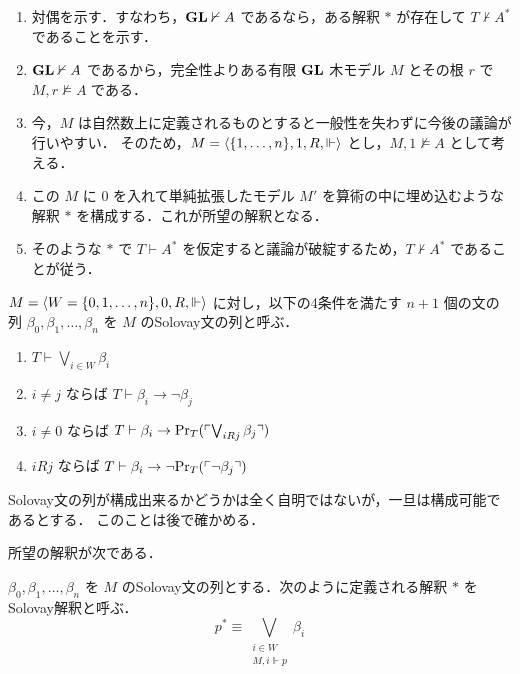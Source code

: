 \documentclass{jlreq}
\begin{document}
\begin{outline}
	\begin{enumerate}
		\item 対偶を示す．すなわち，$\mathbf{GL} \nvdash A$ であるなら，ある解釈 $*$ が存在して $T \nvdash A^*$ であることを示す．
		\item $\mathbf{GL} \nvdash A$ であるから，完全性よりある有限 $\mathbf{GL}$ 木モデル $M$ とその根 $r$ で $M,r \nvDash A$ である．
		\item 今，$M$ は自然数上に定義されるものとすると一般性を失わずに今後の議論が行いやすい．
		      そのため，$M = \langle \{1,\dots,n\}, 1, R, \Vdash \rangle$ とし，$M,1 \nvDash A$ として考える．
		\item この $M$ に $0$ を入れて単純拡張したモデル $M'$ を算術の中に埋め込むような解釈 $*$ を構成する．これが所望の解釈となる．
		\item そのような $*$ で $T \vdash A^*$ を仮定すると議論が破綻するため，$T \nvdash A^*$ であることが従う．
	\end{enumerate}
\end{outline}

\begin{definition}
	$M = \langle W = \{0,1,\dots,n\}, 0, R, \Vdash \rangle$ に対し，以下の4条件を満たす $n + 1$ 個の文の列 $\beta_0, \beta_1, \dots, \beta_n$ を $M$ のSolovay文の列と呼ぶ．
	\begin{enumerate}
		\item $T \vdash \bigvee_{i \in W} \beta_i$
		\item $i \neq j$ ならば $T \vdash \beta_i \to \lnot \beta_j$
		\item $i \neq 0$ ならば $T \vdash \beta_i \to \mathrm{Pr}_T(\ulcorner \bigvee_{i R j} \beta_j \urcorner)$
		\item $i R j$ ならば $T \vdash \beta_i \to \lnot \mathrm{Pr}_T(\ulcorner \lnot \beta_j \urcorner)$
	\end{enumerate}
\end{definition}

\begin{remark}
	Solovay文の列が構成出来るかどうかは全く自明ではないが，一旦は構成可能であるとする．
	このことは後で確かめる．
\end{remark}

所望の解釈が次である．

\begin{definition}
	$\beta_0, \beta_1, \dots, \beta_n$ を $M$ のSolovay文の列とする．次のように定義される解釈 $*$ をSolovay解釈と呼ぶ．
	\begin{equation*}
		p^* \equiv \bigvee_{\substack{i \in W \\ M, i \Vdash p}} \beta_i
	\end{equation*}
\end{definition}
\end{document}
